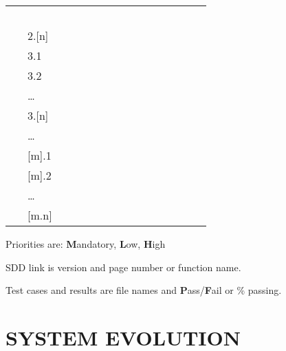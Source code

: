\documentclass[twoside,letterpaper]{article}
\begin{document}
\begin{flushleft}
\begin{supertabular}{m{0.9212598in}|m{0.42125985in}|m{1.9212599in}|m{0.39275986in}|m{0.7587598in}|m{0.6622598in}|m{0.5462598in}|m{0.6712598in}|m{0.6087598in}|m{0.6712598in}|m{0.6295598in}|}
~
 &
~
 &
~
 &
~
 &
~
 &
~
 &
~
 &
~
 &
~
\\\hhline{~----------}
 &
\centering {}\color{black} 2.[n] &
~
 &
~
 &
~
 &
~
 &
~
 &
~
 &
~
 &
~
 &
~
\\\hhline{~----------}
 &
\centering {}\color{black} 3.1 &
~
 &
~
 &
~
 &
~
 &
~
 &
~
 &
~
 &
~
 &
~
\\\hline
 &
\centering {}\color{black} 3.2 &
~
 &
~
 &
~
 &
~
 &
~
 &
~
 &
~
 &
~
 &
~
\\\hhline{~----------}
 &
\centering {}\color{black} {\dots} &
~
 &
~
 &
~
 &
~
 &
~
 &
~
 &
~
 &
~
 &
~
\\\hhline{~----------}
 &
\centering {}\color{black} 3.[n] &
~
 &
~
 &
~
 &
~
 &
~
 &
~
 &
~
 &
~
 &
~
\\\hhline{~----------}
 &
\centering {}\color{black} {\dots} &
~
 &
~
 &
~
 &
~
 &
~
 &
~
 &
~
 &
~
 &
~
\\\hline
{} &
\centering {}\color{black} [m].1 &
~
 &
~
 &
~
 &
~
 &
~
 &
~
 &
~
 &
~
 &
~
\\\hline
 &
\centering {}\color{black} [m].2 &
~
 &
~
 &
~
 &
~
 &
~
 &
~
 &
~
 &
~
 &
~
\\\hhline{~----------}
 &
\centering {}\color{black} {\dots} &
~
 &
~
 &
~
 &
~
 &
~
 &
~
 &
~
 &
~
 &
~
\\\hline
{} &
\centering {}\color{black} [m.n] &
~
 &
~
 &
~
 &
~
 &
~
 &
~
 &
~
 &
~
 &
~
\\\hline
\end{supertabular}
\end{flushleft}
{\color{black}
Priorities are: \textbf{M}andatory, \textbf{L}ow, \textbf{H}igh}

{\color{black}
SDD link is version and page number or function name.}

{\color{black}
Test cases and results are file names and \textbf{P}ass/\textbf{F}ail or
\% passing.}

\clearpage\pagestyle{Standard}
\section[SYSTEM EVOLUTION]{\rmfamily\bfseries\color{black}
SYSTEM EVOLUTION}
\clearpage\pagestyle{Appendix}
\end{document}
